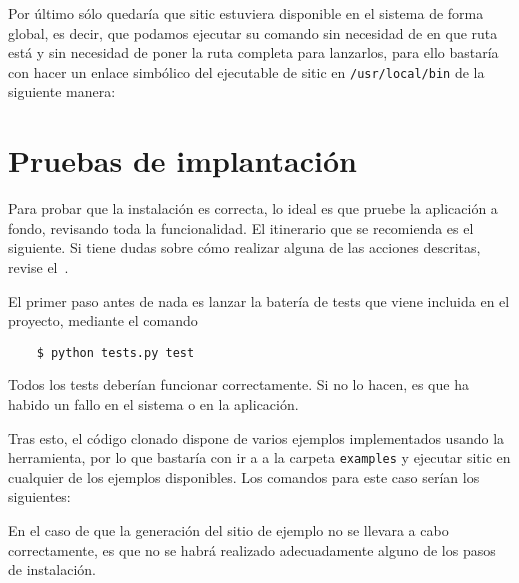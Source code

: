 Por último sólo quedaría que sitic estuviera disponible en el sistema de forma global, es decir,
que podamos ejecutar su comando sin necesidad de en que ruta está y sin necesidad de poner la ruta completa
para lanzarlos, para ello bastaría con hacer un enlace simbólico del ejecutable de sitic en
\texttt{/usr/local/bin} de la siguiente manera:


\section{Pruebas de implantación}

Para probar que la instalación es correcta, lo ideal es que pruebe la aplicación
a fondo, revisando toda la funcionalidad. El itinerario que se recomienda es el
siguiente. Si tiene dudas sobre cómo realizar alguna de las acciones descritas,
revise el~.

El primer paso antes de nada es lanzar la batería de tests que viene incluida en
el proyecto, mediante el comando

\begin{verbatim}
    $ python tests.py test
\end{verbatim}

Todos los tests deberían funcionar correctamente. Si no lo hacen, es que ha
habido un fallo en el sistema o en la aplicación.

Tras esto, el código clonado dispone de varios ejemplos implementados usando la herramienta,
por lo que bastaría con ir a a la carpeta \texttt{examples} y ejecutar sitic en cualquier
de los ejemplos disponibles. Los comandos para este caso serían los siguientes:


En el caso de que la generación del sitio de ejemplo no se llevara a cabo
correctamente, es que no se habrá realizado adecuadamente alguno de los pasos de instalación.
